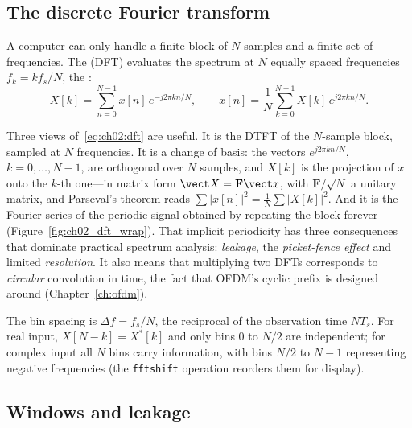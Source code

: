 \subsection{The discrete Fourier transform}

A computer can only handle a finite block of $N$ samples and a finite set of frequencies. The
 (DFT) evaluates the spectrum at $N$ equally spaced frequencies
$f_k=kf_s/N$, the :
\begin{equation}
X[k]=\sum_{n=0}^{N-1}x[n]\,e^{-j2\pi kn/N},\qquad
x[n]=\frac1N\sum_{k=0}^{N-1}X[k]\,e^{j2\pi kn/N}.
\label{eq:ch02:dft}
\end{equation}

Three views of~\eqref{eq:ch02:dft} are useful. It is the DTFT of the $N$-sample block, sampled at $N$
frequencies. It is a change of basis: the vectors $e^{j2\pi kn/N}$, $k=0,\dots,N-1$, are orthogonal
over $N$ samples, and $X[k]$ is the projection of $x$ onto the $k$-th one---in matrix form
$\vect X=\mathbf F\vect x$, with $\mathbf F/\sqrt N$ a unitary matrix, and Parseval's theorem reads
$\sum|x[n]|^2=\frac1N\sum|X[k]|^2$. And it is the Fourier series of the periodic signal obtained by
repeating the block forever (Figure~\ref{fig:ch02_dft_wrap}). That implicit periodicity has three
consequences that dominate practical spectrum analysis: \emph{leakage}, the \emph{picket-fence
effect} and limited \emph{resolution}. It also means that multiplying two DFTs corresponds to
\emph{circular} convolution in time, the fact that OFDM's cyclic prefix is designed around
(Chapter~\ref{ch:ofdm}).

The bin spacing is $\Delta f=f_s/N$, the reciprocal of the observation time $NT_s$. For real input,
$X[N-k]=X^*[k]$ and only bins $0$ to $N/2$ are independent; for complex input all $N$ bins carry
information, with bins $N/2$ to $N-1$ representing negative frequencies (the \texttt{fftshift}
operation reorders them for display).

\subsection{Windows and leakage}
\label{sec:windows}

